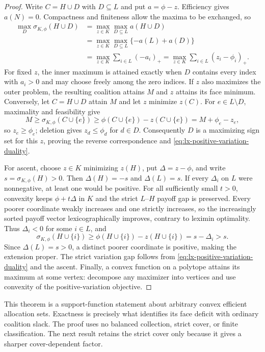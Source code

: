 \begin{proof}
Write $C=H\cup D$ with $D\subseteq L$ and put $a=\phi-z$.  Efficiency
gives $a(N)=0$.  Compactness and finiteness allow the maxima to be exchanged,
so
\begin{align*}
 \max_D\sigma_{K,\phi}(H\cup D)
 &=\max_{z\in K}\max_{D\subseteq L}a(H\cup D)\\
 &=\max_{z\in K}\max_{D\subseteq L}\{-a(L)+a(D)\}\\
 &=\max_{z\in K}\sum_{i\in L}(-a_i)_+
 =\max_{z\in K}\sum_{i\in L}(z_i-\phi_i)_+.
\end{align*}
For fixed $z$, the inner maximum is attained exactly when $D$ contains every
index with $a_i>0$ and may choose freely among the zero indices.  If $z$
also maximizes the outer problem, the resulting coalition attains $M$ and
$z$ attains its face minimum.  Conversely, let $C=H\cup D$ attain $M$ and
let $z$ minimize $z(C)$.  For $e\in L\setminus D$, maximality and feasibility
give
\[
 M\geq\sigma_{K,\phi}(C\cup\{e\})
 \geq\phi(C\cup\{e\})-z(C\cup\{e\})
 =M+\phi_e-z_e,
\]
so $z_e\geq\phi_e$; deletion gives $z_d\leq\phi_d$ for $d\in D$.
Consequently $D$ is a maximizing sign set for this $z$, proving the reverse
correspondence and \eqref{eq:lx-positive-variation-duality}.

For ascent, choose $z\in K$ minimizing $z(H)$, put $\Delta=z-\phi$, and
write $s=\sigma_{K,\phi}(H)>0$.  Then
$\Delta(H)=-s$ and $\Delta(L)=s$.  If every $\Delta_i$ on $L$ were
nonnegative, at least one would be positive.  For all sufficiently small
$t>0$, convexity keeps $\phi+t\Delta$ in $K$ and the strict $L$--$H$ payoff
gap is preserved.  Every poorer coordinate weakly increases and one strictly
increases, so the increasingly sorted payoff vector lexicographically
improves, contrary to leximin optimality.  Thus $\Delta_i<0$ for some
$i\in L$, and
\[
 \sigma_{K,\phi}(H\cup\{i\})
 \geq\phi(H\cup\{i\})-z(H\cup\{i\})
 =s-\Delta_i>s.
\]
Since $\Delta(L)=s>0$, a distinct poorer coordinate is positive, making the
extension proper.
The strict variation gap follows from
\eqref{eq:lx-positive-variation-duality} and the ascent.  Finally, a convex
function on a polytope attains its maximum at some vertex: decompose any
maximizer into vertices and use convexity of the positive-variation
objective.
\end{proof}

This theorem is a support-function statement about arbitrary convex
efficient allocation sets.  Exactness is precisely what identifies its face
deficit with ordinary coalition slack.  The proof uses no balanced
collection, strict cover, or finite classification.  The next result retains
the strict cover only because it gives a sharper cover-dependent factor.

